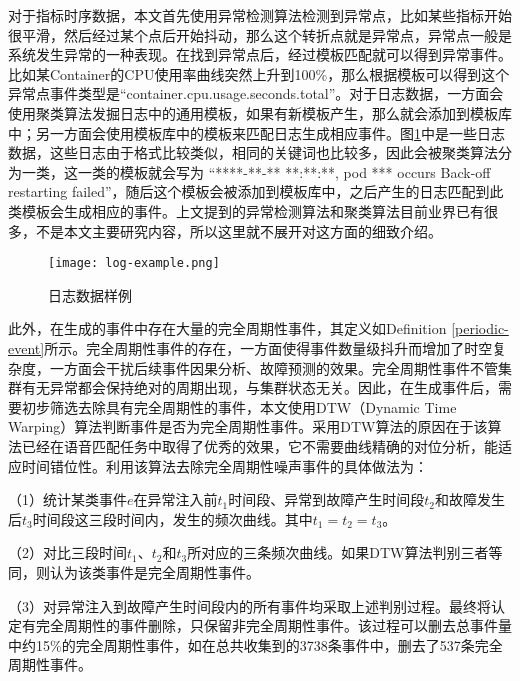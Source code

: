对于指标时序数据，本文首先使用异常检测算法检测到异常点，比如某些指标开始很平滑，然后经过某个点后开始抖动，那么这个转折点就是异常点，异常点一般是系统发生异常的一种表现。在找到异常点后，经过模板匹配就可以得到异常事件。比如某Container的CPU使用率曲线突然上升到100\%，那么根据模板可以得到这个异常点事件类型是“container.cpu.usage.seconds.total”。对于日志数据，一方面会使用聚类算法发掘日志中的通用模板，如果有新模板产生，那么就会添加到模板库中；另一方面会使用模板库中的模板来匹配日志生成相应事件。图\ref{log-example}中是一些日志数据，这些日志由于格式比较类似，相同的关键词也比较多，因此会被聚类算法分为一类，这一类的模板就会写为 “****-**-** **:**:**, pod *** occurs Back-off restarting failed”，随后这个模板会被添加到模板库中，之后产生的日志匹配到此类模板会生成相应的事件。上文提到的异常检测算法\cite{yang2019integrated}和聚类算法\cite{landauer2020system}目前业界已有很多，不是本文主要研究内容，所以这里就不展开对这方面的细致介绍。
\begin{figure}[htbp]
    \centering
    \texttt{[image: log-example.png]}
    \caption{日志数据样例\label{log-example}}
\end{figure}

此外，在生成的事件中存在大量的完全周期性事件，其定义如Definition \ref{periodic-event}所示。完全周期性事件的存在，一方面使得事件数量级抖升而增加了时空复杂度，一方面会干扰后续事件因果分析、故障预测的效果。完全周期性事件不管集群有无异常都会保持绝对的周期出现，与集群状态无关。因此，在生成事件后，需要初步筛选去除具有完全周期性的事件，本文使用DTW（Dynamic Time Warping）算法\cite{mueen2016extracting}判断事件是否为完全周期性事件。采用DTW算法的原因在于该算法已经在语音匹配任务中取得了优秀的效果，它不需要曲线精确的对位分析，能适应时间错位性。利用该算法去除完全周期性噪声事件的具体做法为：

（1）统计某类事件$e$在异常注入前$t_1$时间段、异常到故障产生时间段$t_2$和故障发生后$t_{3}$时间段这三段时间内，发生的频次曲线。其中$t_1 = t_2 = t_3$。

（2）对比三段时间$t_1$、$t_2$和$t_{3}$所对应的三条频次曲线。如果DTW算法判别三者等同，则认为该类事件是完全周期性事件。

（3）对异常注入到故障产生时间段内的所有事件均采取上述判别过程。最终将认定有完全周期性的事件删除，只保留非完全周期性事件。该过程可以删去总事件量中约15\%的完全周期性事件，如在总共收集到的3738条事件中，删去了537条完全周期性事件。

